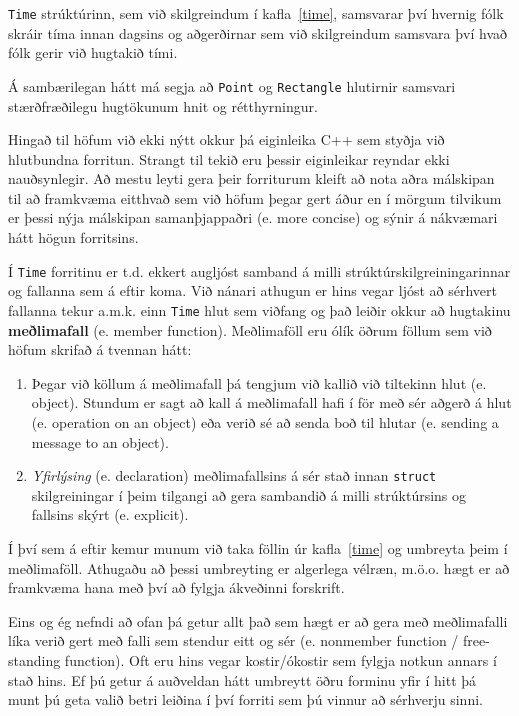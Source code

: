 {\tt Time} strúktúrinn, sem við skilgreindum í kafla~\ref{time},
samsvarar því hvernig fólk skráir tíma innan dagsins og 
aðgerðirnar sem við skilgreindum samsvara því hvað fólk gerir við hugtakið tími.

Á sambærilegan hátt má segja að {\tt Point} og
{\tt Rectangle} hlutirnir samsvari stærðfræðilegu hugtökunum hnit og rétthyrningur.

Hingað til höfum við ekki nýtt okkur þá eiginleika C++ sem styðja við hlutbundna forritun.
Strangt til tekið eru þessir eiginleikar reyndar ekki nauðsynlegir.
Að mestu leyti gera þeir forriturum kleift að nota aðra málskipan til að framkvæma eitthvað sem við höfum þegar gert áður
en í mörgum tilvikum er þessi nýja málskipan samanþjappaðri (e. more concise) og sýnir á nákvæmari hátt högun forritsins. 
 
Í {\tt Time} forritinu er t.d. ekkert augljóst samband á milli strúktúrskilgreiningarinnar og fallanna sem á eftir koma.
Við nánari athugun er hins vegar ljóst að sérhvert fallanna tekur a.m.k. einn {\tt Time} hlut sem viðfang og það leiðir okkur að hugtakinu  {\bf meðlimafall} (e. member function).
Meðlimaföll eru ólík öðrum föllum sem við höfum skrifað á tvennan hátt:

\begin{enumerate}

\item Þegar við köllum á meðlimafall þá tengjum við kallið við tiltekinn hlut (e. object).
Stundum er sagt að kall á meðlimafall hafi í för með sér aðgerð á hlut (e. operation on an object) 
eða verið sé að senda boð til hlutar (e. sending a message to an object).

\item {\em Yfirlýsing} (e. declaration) meðlimafallsins á sér stað innan {\tt struct}
skilgreiningar í þeim tilgangi að gera sambandið á milli strúktúrsins og fallsins skýrt (e. explicit). 

\end{enumerate}

Í því sem á eftir kemur munum við taka föllin úr kafla~\ref{time} og umbreyta þeim í meðlimaföll.
Athugaðu að þessi umbreyting er algerlega vélræn, m.ö.o. hægt er að framkvæma hana með því að fylgja ákveðinni forskrift.


Eins og ég nefndi að ofan þá getur allt það sem hægt er að gera með meðlimafalli líka verið gert með falli sem stendur eitt og sér (e. nonmember function / free-standing function).
Oft eru hins vegar kostir/ókostir sem fylgja notkun annars í stað hins.
Ef þú getur á auðveldan hátt umbreytt öðru forminu yfir í hitt þá munt þú geta valið betri leiðina í því forriti sem þú vinnur að sérhverju sinni.

